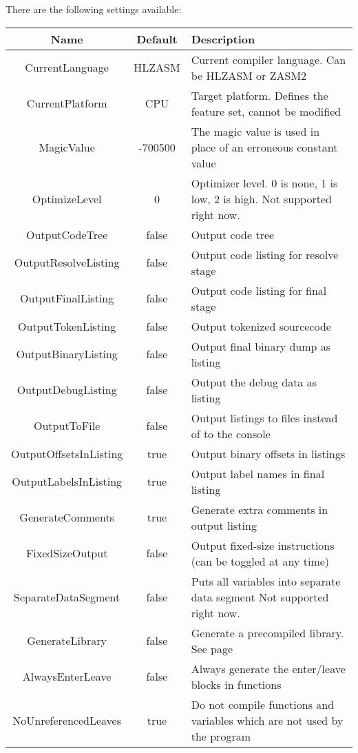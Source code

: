 There are the following settings available:
\singlespacing
\begin{longtable}{|c|c|p{3.0in}|} \hline
Name & Default & Description \\ \hline
CurrentLanguage        & HLZASM  & Current compiler language. Can be HLZASM or ZASM2 \\ \hline
CurrentPlatform        & CPU     & Target platform. Defines the feature set, cannot be modified \\ \hline
MagicValue             & -700500 & The magic value is used in place of an erroneous constant value \\ \hline
OptimizeLevel          & 0       & Optimizer level. 0 is none, 1 is low, 2 is high. Not supported right now. \\ \hline

OutputCodeTree         & false   & Output code tree\\ \hline
OutputResolveListing   & false   & Output code listing for resolve stage \\ \hline
OutputFinalListing     & false   & Output code listing for final stage \\ \hline
OutputTokenListing     & false   & Output tokenized sourcecode \\ \hline
OutputBinaryListing    & false   & Output final binary dump as listing \\ \hline
OutputDebugListing     & false   & Output the debug data as listing \\ \hline
OutputToFile           & false   & Output listings to files instead of to the console \\ \hline
OutputOffsetsInListing & true    & Output binary offsets in listings \\ \hline
OutputLabelsInListing  & true    & Output label names in final listing \\ \hline
GenerateComments       & true    & Generate extra comments in output listing \\ \hline

FixedSizeOutput        & false   & Output fixed-size instructions (can be toggled at any time) \\ \hline
SeparateDataSegment    & false   & Puts all variables into separate data segment Not supported right now. \\ \hline
GenerateLibrary        & false   & Generate a precompiled library. See page \pageref{libgen} \\ \hline
AlwaysEnterLeave       & false   & Always generate the enter/leave blocks in functions \\ \hline
NoUnreferencedLeaves   & true    & Do not compile functions and variables which are not used by the program \\ \hline
\end{longtable}
\onehalfspacing

